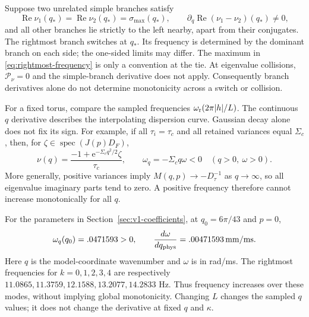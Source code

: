 \documentclass[11pt]{article}
\newcommand{\ee}{\mathrm{e}}
\DeclareMathOperator{\RePart}{Re}
\begin{document}
Suppose two unrelated simple branches satisfy
\begin{equation}
 \RePart\nu_1(q_*)=\RePart\nu_2(q_*)=\sigma_{\max}(q_*),\qquad
 \partial_q\RePart(\nu_1-\nu_2)(q_*)\neq0,
 \label{eq:dominance-switch}
\end{equation}
and all other branches lie strictly to the left nearby, apart from their
conjugates. The rightmost branch switches at $q_*$. Its frequency is determined
by the dominant branch on each side; the one-sided limits may differ.
The maximum in \eqref{eq:rightmost-frequency} is only a convention at the tie.
At eigenvalue collisions, $\mathcal P_\nu=0$ and the simple-branch derivative
does not apply. Consequently branch derivatives alone do not determine
monotonicity across a switch or collision.

For a fixed torus, compare the sampled frequencies
$\omega_{\rm r}(2\pi |h|/L)$. The continuous $q$ derivative describes the
interpolating dispersion curve. Gaussian decay alone does not fix its sign.
For example, if all $\tau_i=\tau_c$ and all retained variances equal
$\Sigma_c$, then, for $\zeta\in\operatorname{spec}(J(p)D_F)$,
\begin{equation}
 \nu(q)=\frac{-1+\ee^{-\Sigma_cq^2/2}\zeta}{\tau_c},
 \qquad \omega_q=-\Sigma_cq\omega<0\quad(q>0,\ \omega>0).
\end{equation}
More generally, positive variances imply $M(q,p)\to-D_\tau^{-1}$ as
$q\to\infty$, so all eigenvalue imaginary parts tend to zero.
A positive frequency therefore cannot increase monotonically for all $q$.

For the parameters in Section~\ref{sec:v1-coefficients}, at
$q_0=6\pi/43$ and $p=0$,
\begin{equation}
 \omega_q(q_0)=.0471593>0,\qquad
 \frac{d\omega}{dq_{\rm phys}}=.00471593\,\mathrm{mm/ms}.
 \label{eq:v1-local-frequency-slope}
\end{equation}
Here $q$ is the model-coordinate wavenumber and $\omega$ is in rad/ms.
The rightmost frequencies for $k=0,1,2,3,4$ are respectively
$11.0865,11.3759,12.1588,13.2077,14.2833$ Hz.
Thus frequency increases over these modes, without implying global
monotonicity. Changing $L$ changes the sampled $q$ values; it does not
change the derivative at fixed $q$ and $\kappa$.

\end{document}

